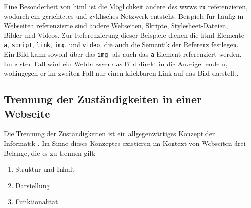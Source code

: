             Eine Besonderheit von \gls{html} ist die Möglichkeit
            andere {\resources} des \glspl{www} zu referenzieren,
            wodurch ein gerichtetes und zyklisches Netzwerk entsteht.
            Beispiele für häufig in Webseiten referenzierte {\resources}
            sind andere Webseiten, Skripte, Stylesheet-Dateien, Bilder und Videos.
            Zur Referenzierung dieser Beispiele dienen die \gls{html}-Elemente
            \texttt{a}, \texttt{script}, \texttt{link}, \texttt{img}, und \texttt{video},
            die auch die Semantik der Referenz festlegen.
            Ein Bild kann sowohl über das \texttt{img}-
            als auch das \texttt{a}-Element referenziert werden.
            Im ersten Fall wird ein Webbrowser das Bild direkt in die Anzeige rendern,
            wohingegen er im zweiten Fall nur einen klickbaren Link auf das Bild darstellt.

        \subsection{Trennung der Zuständigkeiten in einer Webseite}
            \label{section:problemAnalysisWebpagesInTheWWWSeparationOfConcerns}
            Die Trennung der Zuständigkeiten
            ist ein allgegenwärtiges Konzept der Informatik \cite{huersch:SeparationOfConcerns}.
            Im Sinne dieses Konzeptes existieren im Kontext von Webseiten
            drei Belange, die es zu trennen gilt:

            \begin{enumerate}
                \item Struktur und Inhalt
                \item Darstellung
                \item Funktionalität
            \end{enumerate}

